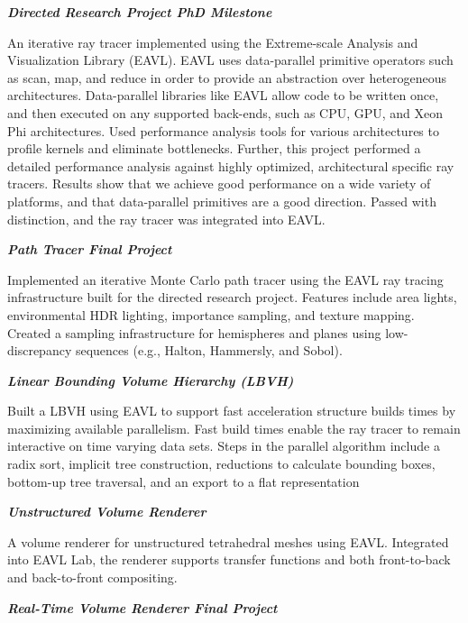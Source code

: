 \documentclass[margin,line]{res}
\begin{document}
\begin{resume}
{\em \textbf{Directed Research Project PhD Milestone } }

\vspace{-.4cm}
An iterative ray tracer implemented using the Extreme-scale Analysis and Visualization Library (EAVL). EAVL uses data-parallel primitive operators such as scan, map, and reduce in order to provide an abstraction over heterogeneous architectures. Data-parallel libraries like EAVL allow code to be written once, and then executed on any supported back-ends, such as CPU, GPU, and Xeon Phi architectures. Used performance analysis tools for various architectures to profile kernels and eliminate bottlenecks. Further, this project performed a detailed performance analysis against highly optimized, architectural specific ray tracers. Results show that we achieve good performance on a wide variety of platforms, and that data-parallel primitives are a good direction. Passed with distinction, and the ray tracer was integrated into EAVL.

{\em \textbf{Path Tracer Final Project} }

\vspace{-.4cm}
Implemented an iterative Monte Carlo path tracer using the EAVL ray tracing infrastructure built for the directed research project. Features include area lights, environmental HDR lighting, importance sampling, and texture mapping. Created a sampling infrastructure for hemispheres and planes using low-discrepancy sequences (e.g., Halton, Hammersly, and Sobol). 

{\em \textbf{Linear Bounding Volume Hierarchy (LBVH)} }

\vspace{-.4cm}
Built a LBVH using EAVL to support fast acceleration structure builds times by maximizing available parallelism. Fast build times enable the ray tracer to remain interactive on time varying data sets. Steps in the parallel algorithm include a radix sort, implicit tree construction, reductions to calculate bounding boxes, bottom-up tree traversal, and an export to a flat representation

{\em \textbf{Unstructured Volume Renderer} }

\vspace{-.4cm}
A volume renderer for unstructured tetrahedral meshes using EAVL. Integrated into EAVL Lab, the renderer supports transfer functions and both front-to-back and back-to-front compositing.

{\em \textbf{Real-Time Volume Renderer Final Project} }


\end{resume}
\end{document}

